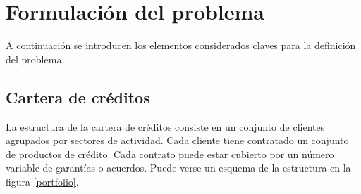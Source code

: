 
%
%
%
%
%
%
%
%

\chapter{Formulaci\'on del problema}
\label{sec:formulation}

\begin{center}
\end{center}

A continuaci\'on se introducen los elementos considerados claves para la 
definici\'on del problema.


\section{Cartera de cr\'editos}

La estructura de la cartera de cr\'editos consiste en un conjunto de
clientes agrupados por sectores de actividad. Cada cliente tiene contratado 
un conjunto de productos de cr\'edito. Cada contrato puede estar 
cubierto por un n\'umero variable de garant\'ias o acuerdos.
Puede verse un esquema de la estructura en la figura \ref{portfolio}.

